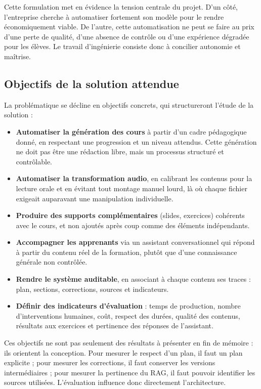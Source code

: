\documentclass[12pt,a4paper]{article}
\begin{document}
Cette formulation met en évidence la tension centrale du projet. D'un côté, l'entreprise
cherche à automatiser fortement son modèle pour le rendre économiquement viable. De
l'autre, cette automatisation ne peut se faire au prix d'une perte de qualité, d'une absence
de contrôle ou d'une expérience dégradée pour les élèves. Le travail d'ingénierie consiste
donc à concilier autonomie et maîtrise.

\subsection{Objectifs de la solution attendue}

La problématique se décline en objectifs concrets, qui structureront l'étude de la solution :

\begin{itemize}
\item \textbf{Automatiser la génération des cours} à partir d'un cadre pédagogique donné,
en respectant une progression et un niveau attendus. Cette génération ne doit pas être une
rédaction libre, mais un processus structuré et contrôlable.
\item \textbf{Automatiser la transformation audio}, en calibrant les contenus pour la
lecture orale et en évitant tout montage manuel lourd, là où chaque fichier exigeait
auparavant une manipulation individuelle.
\item \textbf{Produire des supports complémentaires} (slides, exercices) cohérents avec le
cours, et non ajoutés après coup comme des éléments indépendants.
\item \textbf{Accompagner les apprenants} via un assistant conversationnel qui répond à
partir du contenu réel de la formation, plutôt que d'une connaissance générale non
contrôlée.
\item \textbf{Rendre le système auditable}, en associant à chaque contenu ses traces :
plan, sections, corrections, sources et indicateurs.
\item \textbf{Définir des indicateurs d'évaluation} : temps de production, nombre
d'interventions humaines, coût, respect des durées, qualité des contenus, résultats aux
exercices et pertinence des réponses de l'assistant.
\end{itemize}

Ces objectifs ne sont pas seulement des résultats à présenter en fin de mémoire : ils
orientent la conception. Pour mesurer le respect d'un plan, il faut un plan explicite ; pour
mesurer les corrections, il faut conserver les versions intermédiaires ; pour mesurer la
pertinence du RAG, il faut pouvoir identifier les sources utilisées. L'évaluation
influence donc directement l'architecture.
\end{document}
